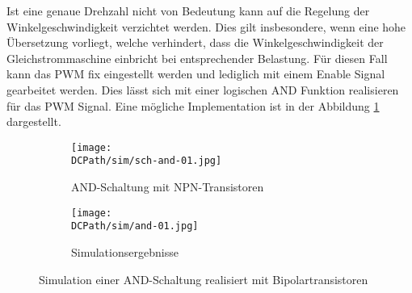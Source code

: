 Ist eine genaue Drehzahl nicht von Bedeutung kann auf die Regelung der
Winkelgeschwindigkeit verzichtet werden. Dies gilt insbesondere, wenn eine
hohe Übersetzung vorliegt, welche verhindert, dass die Winkelgeschwindigkeit
der Gleichstrommaschine einbricht bei entsprechender Belastung. Für diesen
Fall kann das PWM fix eingestellt werden und lediglich mit einem Enable
Signal gearbeitet werden. Dies lässt sich mit einer logischen AND Funktion
realisieren für das PWM Signal. Eine mögliche Implementation ist in der
Abbildung \ref{fig:and} dargestellt.

\begin{figure}[h!]
    \centering
    \begin{subfigure}[b]{0.45\textwidth}
        \texttt{[image: \\DCPath/sim/sch-and-01.jpg]}
        \caption{AND-Schaltung mit NPN-Transistoren}
    \end{subfigure}
    \begin{subfigure}[b]{0.45\textwidth}
        \texttt{[image: \\DCPath/sim/and-01.jpg]}
        \caption{Simulationsergebnisse}
    \end{subfigure}
    \caption{Simulation einer AND-Schaltung realisiert mit
        Bipolartransistoren}
    \label{fig:and}
\end{figure}

